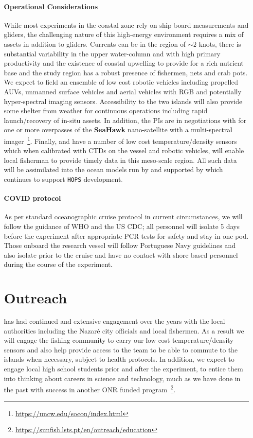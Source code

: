 \paragraph{Operational Considerations} While most experiments in the
coastal zone rely on ship-board measurements and gliders, the
challenging nature of this high-energy environment requires a mix of
assets in addition to gliders. Currents can be in the region of
$\sim 2$ knots, there is substantial variability in the upper
water-column and with high primary productivity and the existence of
coastal upwelling to provide for a rich nutrient base and the study
region has a robust presence of fishermen, nets and crab pots. We
expect to field an ensemble of low cost robotic vehicles including
propelled AUVs, unmanned surface vehicles and aerial vehicles with RGB
and potentially hyper-spectral imaging sensors. Accessibility to the
two islands will also provide some shelter from weather for continuous
operations including rapid launch/recovery of in-situ assets. In
addition, the PIs are in negotiations with \nas for one or more
overpasses of the \textbf{SeaHawk} nano-satellite with a
multi-spectral
imager~\footnote{\url{https://uncw.edu/socon/index.html}}. Finally,
\univ and \inst have a number of low cost temperature/density sensors
which when calibrated with CTDs on the vessel and robotic vehicles,
will enable local fisherman to provide timely data in this meso-scale
region. All such data will be assimilated into the ocean models run by
\inst and supported by \mit which continues to support \texttt{HOPS}
development.

\paragraph{COVID protocol} As per standard oceanographic cruise
protocol in current circumstances, we will follow the guidance of WHO
and the US CDC; all personnel will isolate 5 days before the
experiment after appropriate PCR tests for safety and stay in one
pod. Those onboard the \inst research vessel will follow Portuguese
Navy guidelines and also isolate prior to the cruise and have no
contact with shore based personnel during the course of the
experiment.

\section*{Outreach}

\inst has had continued and extensive engagement over the years with
the local authorities including the Nazar\'e city officials and local
fishermen. As a result we will engage the fishing community to carry
our low cost temperature/density sensors and also help provide access
to the team to be able to commute to the islands when necessary,
subject to health protocols. In addition, we expect to engage local
high school students prior and after the experiment, to entice them
into thinking about careers in science and technology, much as we have
done in the past with success in another ONR funded
program~\footnote{\url{https://sunfish.lsts.pt/en/outreach/education}}.

